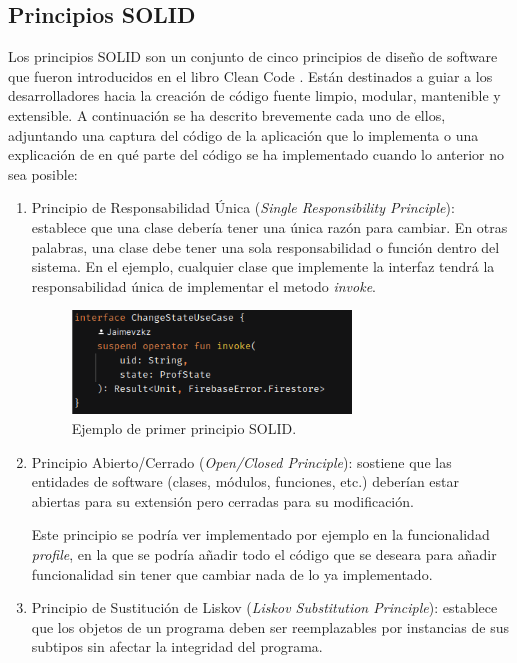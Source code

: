 \subsection{Principios SOLID}
\label{subsec:solid}
Los principios SOLID son un conjunto de cinco principios de diseño de software que fueron introducidos en el libro Clean Code \citep{CleanCode}. Están destinados a guiar a los desarrolladores hacia la creación de código fuente limpio, modular, mantenible y extensible. A continuación se ha descrito brevemente cada uno de ellos, adjuntando una captura del código de la aplicación que lo implementa o una explicación de en qué parte del código se ha implementado cuando lo anterior no sea posible:
\begin{enumerate}
    \item Principio de Responsabilidad Única (\textit{Single Responsibility Principle}): establece que una clase debería tener una única razón para cambiar. En otras palabras, una clase debe tener una sola responsabilidad o función dentro del sistema. En el ejemplo, cualquier clase que implemente la interfaz tendrá la responsabilidad única de implementar el metodo \textit{invoke}.
    \begin{figure}[h]
        \centering
        \includegraphics[width = 0.7\textwidth]{Imagenes/Fuentes/change_state.png}
        \caption{Ejemplo de primer principio SOLID.}
        \label{fig:change_state}
    \end{figure}
    \item Principio Abierto/Cerrado (\textit{Open/Closed Principle}): sostiene que las entidades de software (clases, módulos, funciones, etc.) deberían estar abiertas para su extensión pero cerradas para su modificación.
    
    Este principio se podría ver implementado por ejemplo en la funcionalidad \textit{profile}, en la que se podría añadir todo el código que se deseara para añadir funcionalidad sin tener que cambiar nada de lo ya implementado.
    \item Principio de Sustitución de Liskov (\textit{Liskov Substitution Principle}): establece que los objetos de un programa deben ser reemplazables por instancias de sus subtipos sin afectar la integridad del programa.
    

\end{enumerate}
